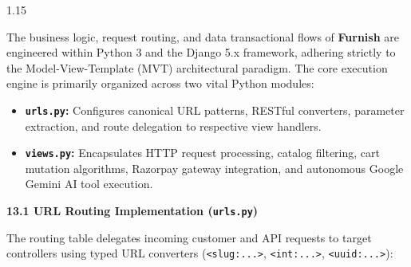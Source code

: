 \documentclass[12pt,a4paper]{article}
\begin{document}
{\fontsize{13}{18}\selectfont
\begin{spacing}{1.15}

\noindent
The business logic, request routing, and data transactional flows of \textbf{Furnish} are engineered within Python 3 and the Django 5.x framework, adhering strictly to the Model-View-Template (MVT) architectural paradigm. The core execution engine is primarily organized across two vital Python modules:
\begin{itemize}
    \setlength{\itemsep}{2pt}
    \item \textbf{\texttt{urls.py}:} Configures canonical URL patterns, RESTful converters, parameter extraction, and route delegation to respective view handlers.
    \item \textbf{\texttt{views.py}:} Encapsulates HTTP request processing, catalog filtering, cart mutation algorithms, Razorpay gateway integration, and autonomous Google Gemini AI tool execution.
\end{itemize}

\vspace{0.08in}

\noindent
\textbf{13.1 URL Routing Implementation (\texttt{urls.py})}

\vspace{0.04in}

\noindent
{\fontsize{11}{14}\selectfont The routing table delegates incoming customer and API requests to target controllers using typed URL converters (\texttt{<slug:...>}, \texttt{<int:...>}, \texttt{<uuid:...>}):}

\end{spacing}
}

\vspace{0.06in}
\end{document}
